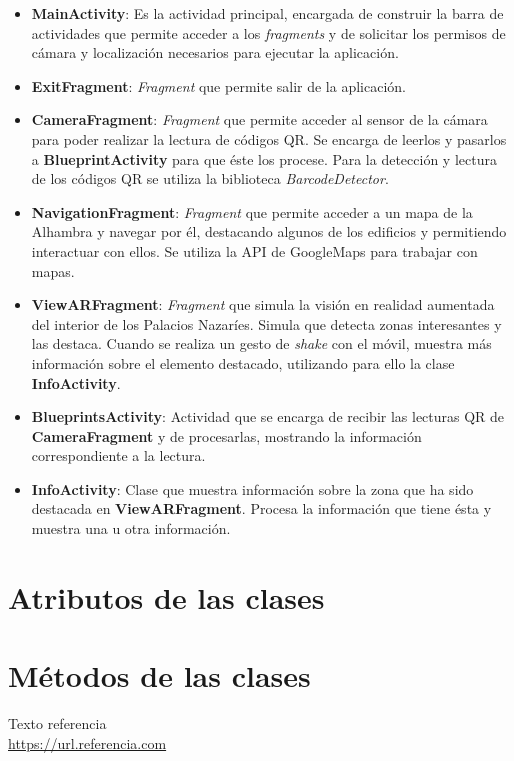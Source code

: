\documentclass[11pt,a4paper]{article}
\begin{document}
\begin{itemize}
	\item \textbf{MainActivity}: Es la actividad principal, encargada de construir la barra de actividades que permite acceder
	a los \textit{fragments} y de solicitar los permisos de cámara y localización necesarios para ejecutar la aplicación.
	\item \textbf{ExitFragment}: \textit{Fragment} que permite salir de la aplicación.
	\item \textbf{CameraFragment}: \textit{Fragment} que permite acceder al sensor de la cámara para poder realizar la lectura
	de códigos QR. Se encarga de leerlos y pasarlos a \textbf{BlueprintActivity} para que éste los procese. Para la detección y
	lectura de los códigos QR se utiliza la biblioteca \textit{BarcodeDetector}.
	\item \textbf{NavigationFragment}: \textit{Fragment} que permite acceder a un mapa de la Alhambra y navegar por él, destacando
	algunos de los edificios y permitiendo interactuar con ellos. Se utiliza la API de GoogleMaps para trabajar con mapas.
	\item \textbf{ViewARFragment}: \textit{Fragment} que simula la visión en realidad aumentada del interior de los Palacios
	Nazaríes. Simula que detecta zonas interesantes y las destaca. Cuando se realiza un gesto de \textit{shake} con el móvil,
	muestra más información sobre el elemento destacado, utilizando para ello la clase \textbf{InfoActivity}.
	\item \textbf{BlueprintsActivity}: Actividad que se encarga de recibir las lecturas QR de \textbf{CameraFragment} y de
	procesarlas, mostrando la información correspondiente a la lectura.
	\item \textbf{InfoActivity}: Clase que muestra información sobre la zona que ha sido destacada en \textbf{ViewARFragment}.
	Procesa la información que tiene ésta y muestra una u otra información.
\end{itemize}

\section{Atributos de las clases}

\section{Métodos de las clases}

\newpage

\begin{thebibliography}{5}

Texto referencia
\\\url{https://url.referencia.com}

\end{thebibliography}
\end{document}
